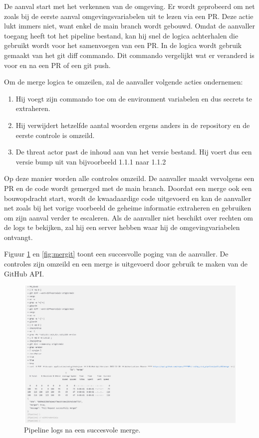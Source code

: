 De aanval start met het verkennen van de omgeving. Er wordt geprobeerd om net zoals bij de eerste aanval omgevingsvariabelen uit te lezen via een PR. Deze actie lukt immers niet, want enkel de main branch wordt gebouwd. Omdat de aanvaller toegang heeft tot het pipeline bestand, kan hij snel de logica achterhalen die gebruikt wordt voor het samenvoegen van een PR. In de logica wordt gebruik gemaakt van het git diff commando. Dit commando vergelijkt wat er veranderd is voor en na een PR of een git push.
\newline

Om de merge logica te omzeilen, zal de aanvaller volgende acties ondernemen:

\begin{enumerate}
  \item Hij voegt zijn commando toe om de environment variabelen en dus secrets te extraheren.
  \item Hij verwijdert hetzelfde aantal woorden ergens anders in de repository en de eerste controle is omzeild.
  \item De threat actor past de inhoud aan van het versie bestand. Hij voert dus een versie bump uit van bijvoorbeeld 1.1.1 naar 1.1.2
\end{enumerate}
\clearpage

Op deze manier worden alle controles omzeild. De aanvaller maakt vervolgens een PR en de code wordt gemerged met de main branch. Doordat een merge ook een bouwopdracht start, wordt de kwaadaardige code uitgevoerd en kan de aanvaller net zoals bij het vorige voorbeeld de geheime informatie extraheren en gebruiken om zijn aanval verder te escaleren. Als de aanvaller niet beschikt over rechten om de logs te bekijken, zal hij een server hebben waar hij de omgevingvariabelen ontvangt.
\newline

Figuur \ref{fig:mergesuc} en \ref{fig:mergit} toont een succesvolle poging van de aanvaller. De controles zijn omzeild en een merge is uitgevoerd door gebruik te maken van de GitHub API.

\begin{figure}[H]
  \includegraphics[scale=0.50]{graphics/mergesucces.png}
\caption{\label{fig:mergesuc} Pipeline logs na een succesvole merge.}
\end{figure}

